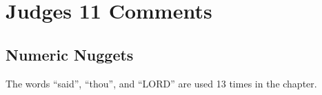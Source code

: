 \section{Judges 11 Comments}

\subsection{Numeric Nuggets}
The words ``said'', ``thou'', and ``LORD'' are used 13 times in the chapter.



